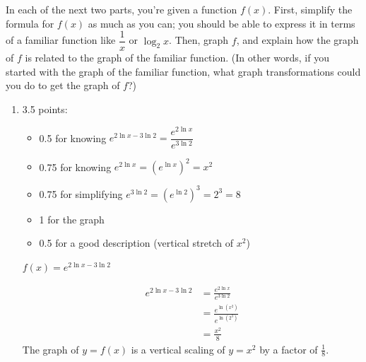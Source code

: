 \documentclass{article}
\begin{document}
\begin{enumerate}
\begin{enumerate}
  \end{enumerate}

  In each of the next two parts, you're given a function $f(x)$. First, simplify the formula for $f(x)$ as much as you can; you should be able to express it in terms of a familiar function like $\dfrac{1}{x}$ or $\log_2 x$. Then, graph $f$, and explain how the graph of $f$ is related to the graph of the familiar function. (In other words, if you started with the graph of the familiar function, what graph transformations could you do to get the graph of $f$?)

  \begin{enumerate}[resume]
  \item

    \begin{grading}
      3.5 points:
      \begin{itemize}[nosep]
      \item 0.5 for knowing $e^{2 \ln x - 3 \ln 2} = \dfrac{e^{2 \ln x}}{e^{3 \ln 2}}$
      \item 0.75 for knowing $e^{2 \ln x} = \left( e^{\ln x} \right)^2 = x^2$
      \item 0.75 for simplifying $e^{3 \ln 2} = \left( e^{\ln 2} \right)^3 = 2^3 = 8$
      \item 1 for the graph
      \item 0.5 for a good description (vertical stretch of $x^2$)
      \end{itemize}
    \end{grading}

    \begin{problem}[\vfill]
      $f(x) = e^{2 \ln x - 3 \ln 2}$
    \end{problem}

    \begin{solution}
      \begin{align*}
          e^{2\ln x - 3\ln 2} &= 
          \frac{e^{2\ln x}}{e^{3\ln 2}} \\
          &= \frac{e^{\ln(x^2)}}{e^{\ln(2^3)}} \\
          &= \frac{x^2}{8}
      \end{align*}
      The graph of $y=f(x)$ is a vertical scaling of $y=x^2$ by
      a factor of $\frac{1}{8}$.
      \begin{center}
      \end{center}
    \end{solution}


\end{enumerate}
\end{enumerate}
\end{document}

